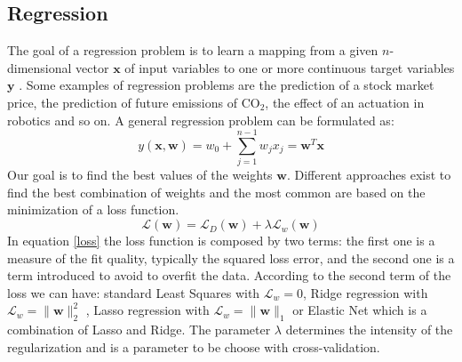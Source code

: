\documentclass[]{article}
\begin{document}
\subsection{Regression}
The goal of a regression problem is to learn a mapping from a given $n$-dimensional vector $\textbf{x}$ of input variables to one or more continuous target variables $\textbf{y}$ \cite{bishop2006}. Some examples of regression problems are the prediction of a stock market price, the prediction of future emissions of CO$_2$, the effect of an actuation in robotics and so on. A general regression problem can be formulated as:
\begin{equation}\label{regression}
y(\textbf{x}, \textbf{w}) = w_0 + \sum_{j=1}^{n-1}w_j x_j = \textbf{w}^T\textbf{x}
\end{equation}
Our goal is to find the best values of the weights $\textbf{w}$. Different approaches exist to find the best combination of weights and the most common are based on the minimization of a loss function.
\begin{equation}\label{loss}
\mathcal{L}(\textbf{w})  = \mathcal{L}_D(\textbf{w}) + \lambda \mathcal{L}_w(\textbf{w})
\end{equation}
In equation \eqref{loss} the loss function is composed by two terms: the first one is a measure of the fit quality, typically the squared loss error, and the second one is a term introduced to avoid to overfit the data. According to the second term of the loss we can have: standard Least Squares with $\mathcal{L}_w = 0$, Ridge regression with $\mathcal{L}_w = \parallel \textbf{w} \parallel_2^2$ , Lasso regression with $\mathcal{L}_w =\parallel \textbf{w} \parallel_1$ or Elastic Net which is a combination of Lasso and Ridge. The parameter $\lambda$ determines the intensity of the regularization and is a parameter to be choose with cross-validation.
\end{document}
